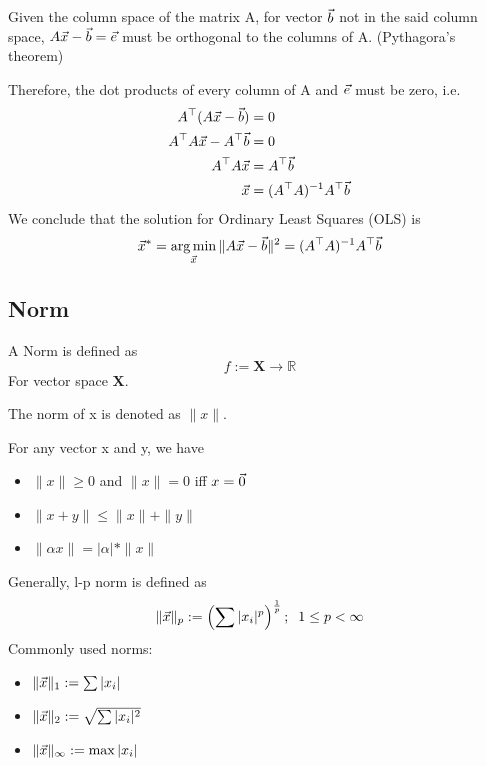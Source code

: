 \begin{theorem}
	Given the column space of the matrix A, for vector $\vec{b}$ not in the said column space, $A\vec{x}-\vec{b} = \vec{e}$ must be orthogonal to the columns of A. (Pythagora's theorem)

Therefore, the dot products of every column of A and $\vec{e}$ must be zero, i.e.
	\begin{align*}
		A^\top(A\vec{x}-\vec{b}) &= 0\\
		A^\top A\vec{x}-A^\top \vec{b} &= 0\\	
		A^\top A\vec{x} &= A^\top \vec{b}\\
		\vec{x} &= (A^\top A)^{-1}A^\top \vec{b}
	\end{align*}
We conclude that the solution for Ordinary Least Squares (OLS) is
\[
\vec{x}^* = \operatorname*{arg\,min}_{\vec{x}}\|A\vec{x}-\vec{b}\|^2 = (A^\top A)^{-1}A^\top \vec{b}
\]
\end{theorem}


\subsection{Norm} %
\label{sub:norm}

\begin{definition}[Norm]
	A Norm is defined as
	\[
	f:= \mathbf{X}\rightarrow\mathbb{R}
	\]
	For vector space $\mathbf{X}$.

	The norm of x is denoted as $\|x\|$.

	For any vector x and y, we have
	\begin{itemize}
		\item $\|x\|\ge0$ and $\|x\|=0$ iff $x=\vec{0}$
		\item $\|x+y\|\le\|x\|+\|y\|$
		\item $\|\alpha x\|=|\alpha|*\|x\|$
	\end{itemize}
\end{definition}

\begin{definition}[l-p Norm]
Generally, l-p norm is defined as
\[
\|\vec{x}\|_p := \left(\sum|x_i|^p\right)^{\frac{1}{p}};\;\;1\le p<\infty
\]
Commonly used norms:
\begin{itemize}
	\item $\|\vec{x}\|_1 := \sum|x_i|$
	\item $\|\vec{x}\|_2 := \sqrt{\sum|x_i|^2}$
	\item $\|\vec{x}\|_\infty := \max|x_i|$
\end{itemize}

\end{definition}

